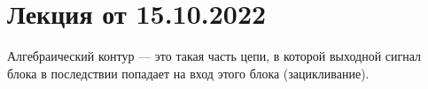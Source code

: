 \section{Лекция от 15.10.2022}
Алгебраический контур --- это такая часть цепи, в которой выходной сигнал блока
в последствии попадает на вход этого блока (зацикливание).
